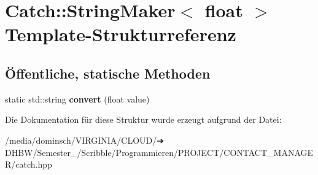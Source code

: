 \hypertarget{structCatch_1_1StringMaker_3_01float_01_4}{}\section{Catch\+:\+:String\+Maker$<$ float $>$ Template-\/\+Strukturreferenz}
\label{structCatch_1_1StringMaker_3_01float_01_4}
\subsection*{Öffentliche, statische Methoden}
\begin{DoxyCompactItemize}
\item 
\mbox{\label{structCatch_1_1StringMaker_3_01float_01_4_a7ffacc6fa46a338200f3fbb2ee078648}} 
static std\+::string {\bfseries convert} (float value)
\end{DoxyCompactItemize}


Die Dokumentation für diese Struktur wurde erzeugt aufgrund der Datei\+:\begin{DoxyCompactItemize}
\item 
/media/dominsch/\+V\+I\+R\+G\+I\+N\+I\+A/\+C\+L\+O\+U\+D/➔ D\+H\+B\+W/\+Semester\+\_/\+Scribble/\+Programmieren/\+P\+R\+O\+J\+E\+C\+T/\+C\+O\+N\+T\+A\+C\+T\+\_\+\+M\+A\+N\+A\+G\+E\+R/catch.\+hpp\end{DoxyCompactItemize}
